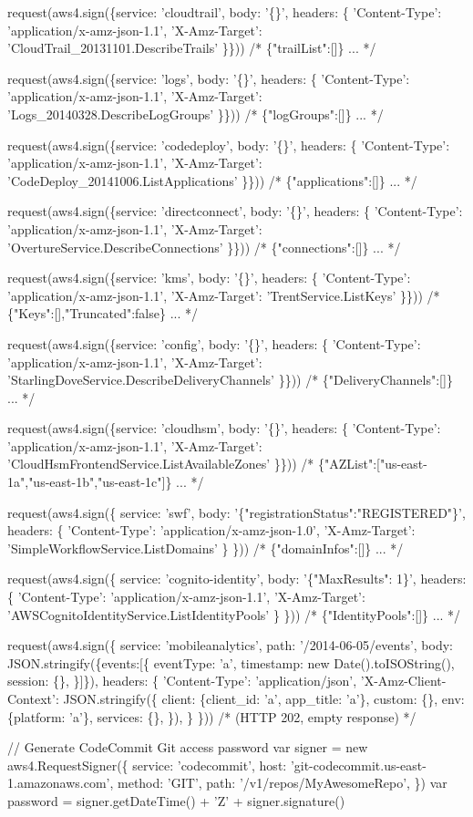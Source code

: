 \begin{DoxyCode}
request(aws4.sign(\{service: 'cloudtrail', body: '\{\}', headers: \{
  'Content-Type': 'application/x-amz-json-1.1',
  'X-Amz-Target': 'CloudTrail\_20131101.DescribeTrails'
\}\}))
/*
\{"trailList":[]\}
...
*/

request(aws4.sign(\{service: 'logs', body: '\{\}', headers: \{
  'Content-Type': 'application/x-amz-json-1.1',
  'X-Amz-Target': 'Logs\_20140328.DescribeLogGroups'
\}\}))
/*
\{"logGroups":[]\}
...
*/

request(aws4.sign(\{service: 'codedeploy', body: '\{\}', headers: \{
  'Content-Type': 'application/x-amz-json-1.1',
  'X-Amz-Target': 'CodeDeploy\_20141006.ListApplications'
\}\}))
/*
\{"applications":[]\}
...
*/

request(aws4.sign(\{service: 'directconnect', body: '\{\}', headers: \{
  'Content-Type': 'application/x-amz-json-1.1',
  'X-Amz-Target': 'OvertureService.DescribeConnections'
\}\}))
/*
\{"connections":[]\}
...
*/

request(aws4.sign(\{service: 'kms', body: '\{\}', headers: \{
  'Content-Type': 'application/x-amz-json-1.1',
  'X-Amz-Target': 'TrentService.ListKeys'
\}\}))
/*
\{"Keys":[],"Truncated":false\}
...
*/

request(aws4.sign(\{service: 'config', body: '\{\}', headers: \{
  'Content-Type': 'application/x-amz-json-1.1',
  'X-Amz-Target': 'StarlingDoveService.DescribeDeliveryChannels'
\}\}))
/*
\{"DeliveryChannels":[]\}
...
*/

request(aws4.sign(\{service: 'cloudhsm', body: '\{\}', headers: \{
  'Content-Type': 'application/x-amz-json-1.1',
  'X-Amz-Target': 'CloudHsmFrontendService.ListAvailableZones'
\}\}))
/*
\{"AZList":["us-east-1a","us-east-1b","us-east-1c"]\}
...
*/

request(aws4.sign(\{
  service: 'swf',
  body: '\{"registrationStatus":"REGISTERED"\}',
  headers: \{
    'Content-Type': 'application/x-amz-json-1.0',
    'X-Amz-Target': 'SimpleWorkflowService.ListDomains'
  \}
\}))
/*
\{"domainInfos":[]\}
...
*/

request(aws4.sign(\{
  service: 'cognito-identity',
  body: '\{"MaxResults": 1\}',
  headers: \{
    'Content-Type': 'application/x-amz-json-1.1',
    'X-Amz-Target': 'AWSCognitoIdentityService.ListIdentityPools'
  \}
\}))
/*
\{"IdentityPools":[]\}
...
*/

request(aws4.sign(\{
  service: 'mobileanalytics',
  path: '/2014-06-05/events',
  body: JSON.stringify(\{events:[\{
    eventType: 'a',
    timestamp: new Date().toISOString(),
    session: \{\},
  \}]\}),
  headers: \{
    'Content-Type': 'application/json',
    'X-Amz-Client-Context': JSON.stringify(\{
      client: \{client\_id: 'a', app\_title: 'a'\},
      custom: \{\},
      env: \{platform: 'a'\},
      services: \{\},
    \}),
  \}
\}))
/*
(HTTP 202, empty response)
*/

// Generate CodeCommit Git access password
var signer = new aws4.RequestSigner(\{
  service: 'codecommit',
  host: 'git-codecommit.us-east-1.amazonaws.com',
  method: 'GIT',
  path: '/v1/repos/MyAwesomeRepo',
\})
var password = signer.getDateTime() + 'Z' + signer.signature()
\end{DoxyCode}


